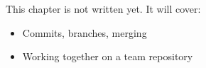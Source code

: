 \label{ch:git}
\begin{keyidea}
This chapter is not written yet. It will cover:
\begin{itemize}[nosep]
  \item Commits, branches, merging
  \item Working together on a team repository
\end{itemize}
\end{keyidea}
